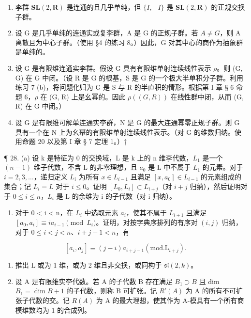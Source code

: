 \begin{enumerate}
\def\labelenumi{\arabic{enumi}.}
\setcounter{enumi}{23}
\item
  李群 \(\mathbf{SL}(2,\mathbf{R})\) 是连通的且几乎单纯，但 \(\{I,-I\}\) 是 \(\mathbf{SL}(2,\mathbf{R})\) 的正规交换子群。
\item
  设 G 是几乎单纯的连通实或复李群，A 是 G 的正规子群。若 \(A \neq G\)，则 A 离散且为中心子群。（使用 §4 的练习 8。）因此，G 对其中心的商作为抽象群是单纯的。
\item
 设 G 是有限维连通实李群。假设 G 具有有限维单射连续线性表示 \(\rho\)。则 (G, G) 在 G 中闭。（设 R 是 G 的根基，S 是 G 的一个极大半单积分子群。利用练习 7 (b)，将问题化归为 G 是 S 与 R 的半直积的情形。根据第 I 章 § 6 命题 6，\(\rho\) 在 (G, R) 上是幺幂的。因此 \(\rho((G, R))\) 在线性群中闭，从而 (G, R) 在 G 中闭。）
\item
  设 G 是有限维可解单连通实李群，N 是 G 的最大连通幂零正规子群。则 G 具有一个在 N 上为幺幂的有限维单射连续线性表示。（对 G 的维数归纳。使用命题 20 以及第 I 章 § 7 定理 1。）†
\end{enumerate}

¶ 28. (a) 设 k 是特征为 0 的交换域，L 是 k 上的 n 维李代数，\(L_{1}\) 是一个 \((n-1)\) 维子代数，不含 L 的非零理想，且 \(a_{0}\) 是 L 中不属于 \(L_{1}\) 的元素。对于 \(i=2,3,\ldots\)，递归定义 \(L_{i}\) 为所有 \(x\in L_{i-1}\) 且满足 \([x,a_{0}]\in L_{i-1}\) 的元素组成的集合；记 \(L_{i}=L\) 对于 \(i\leqslant0\)。证明 \([L_{0},L_{i}]\subset L_{i+j}\)（对 \(i+j\) 归纳），然后证明对于 \(0\leqslant i\leqslant n\)，\(L_{i}\) 是 L 的余维为 i 的子代数（对 i 归纳）。

\begin{enumerate}
\def\labelenumi{(\alph{enumi})}
\setcounter{enumi}{1}
\tightlist
\item
  对于 0 \textless{} i \textless{} n，在 \(L_{i}\) 中选取元素 \(a_{i}\)，使其不属于 \(L_{i+1}\) 且满足 \([a_{0}, a_{i}] \equiv ia_{i-1} \pmod{L_{i}}\)。证明，对按字典序排列的有序对 \((i, j)\) 归纳，对于 \(0 \leqslant i < j < n\)、\(i + j - 1 < n\)，有
\end{enumerate}

\[
[ a _ {i}, a _ {j} ] \equiv (j - i) a _ {i + j - 1} (\mathrm{mod}. \mathrm{L} _ {i + j}).
\]

\begin{enumerate}
\def\labelenumi{(\alph{enumi})}
\setcounter{enumi}{2}
\item
  推出 L 或为 1 维，或为 2 维且非交换，或同构于 \(\mathfrak{sl}(2,k)\)。
\item
  设 A 是有限维实李代数。若 A 的子代数 B 存在满足 \(B_{1} \supset B\) 且 dim \(B_{1} = \dim B + 1\) 的子代数，则称 B 可扩张。记 \(R'(A)\) 为 A 的所有不可扩张子代数的交。记 \(R(A)\) 为 A 的最大理想，使其作为 A-模具有一个所有商模维数均为 1 的合成列。
\end{enumerate}

